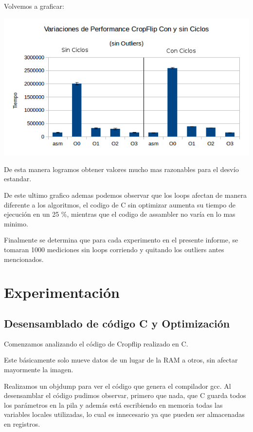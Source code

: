 \documentclass[a4paper]{article}
\begin{document}
Volvemos a graficar:
\begin{center}
  \includegraphics[scale=0.66]{Graficos1.4/1.3/perSinOut.png}
\end{center}
De esta manera logramos obtener valores mucho mas razonables para el desvío estandar.

De este ultimo grafico ademas podemos observar que los loops afectan de manera diferente a los algoritmos, el codigo de C sin optimizar aumenta su tiempo de ejecución en un 25 \%, mientras que el codigo de assambler no varía en lo mas minimo.

Finalmente se determina que para cada experimento en el presente informe, se tomaran 1000 mediciones sin loops corriendo y quitando los outliers antes mencionados.

\newpage

\section{Experimentación}

\subsection{Desensamblado de código C y Optimización}

Comenzamos analizando el código de Cropflip realizado en C.

Este básicamente solo mueve datos de un lugar de la RAM a otros, sin afectar mayormente la imagen.

Realizamos un objdump para ver el código que genera el compilador gcc. Al desensamblar el código pudimos observar, primero que nada, que C guarda todos los parámetros en la pila y además está escribiendo en memoria todas las variables locales utilizadas, lo cual es innecesario ya que pueden ser almacenadas en registros.
\end{document}
